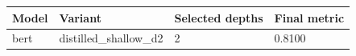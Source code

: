 \begin{tabular}{llll}
\hline
Model & Variant & Selected depths & Final metric \\
\hline
bert & distilled\_shallow\_d2 & 2 & 0.8100 \\
\hline
\end{tabular}
